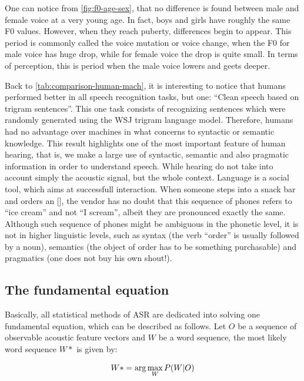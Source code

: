One can notice from \autoref{fig:f0-age-sex}, that no difference is found between male and female voice at a very young age. 
In fact, boys and girls have roughly the same \ac{F0} values. However, when they reach puberty, differences begin to appear. 
This period is commonly called the voice mutation or voice change, when the \ac{F0} for male voice has huge drop, while 
for female voice the drop is quite small. In terms of perception, this is period when the male voice lowers and geets deeper.

Back to \autoref{tab:comparison-human-mach}, it is interesting to notice that humans
performed better in all speech recognition tasks, but one: ``Clean speech based on trigram sentences''.
This one task consists of recognizing sentences which were randomly generated using the WSJ trigram language model. 
Therefore, humans had no advantage over machines in what concerns to syntactic or semantic knowledge. 
This result highlights one of the most important feature of human hearing, that is, we make a large use of syntactic, 
semantic and also pragmatic information in order to understand speech. While hearing do not take into account simply 
the acoustic signal, but the whole context. Language is a social tool, which aims at successfull interaction. When someone steps into a snack bar and orders 
an [], the vendor has no doubt that this sequence of phones refers to ``ice cream'' and not ``I scream'', 
albeit they are pronounced exactly the same. Although such sequence of phones might be ambiguous in the phonetic level,
it is not in higher linguistic levels, such as syntax (the verb ``order'' is usually followed by a noun), semantics 
(the object of order has to be something purchasable) and pragmatics (one does not buy his own shout!).

\subsection{The fundamental equation}

Basically, all statistical methods of \ac{ASR} are dedicated into solving one fundamental 
equation, which can be described as follows. Let $O$ be a sequence of observable acoustic 
feature vectors and $W$ be a word sequence, the most likely word sequence $W*$ is given by:

\begin{equation}{\label{eq:fund-asr}}
W*= \arg\max_{W}P(W|O)
\end{equation}


